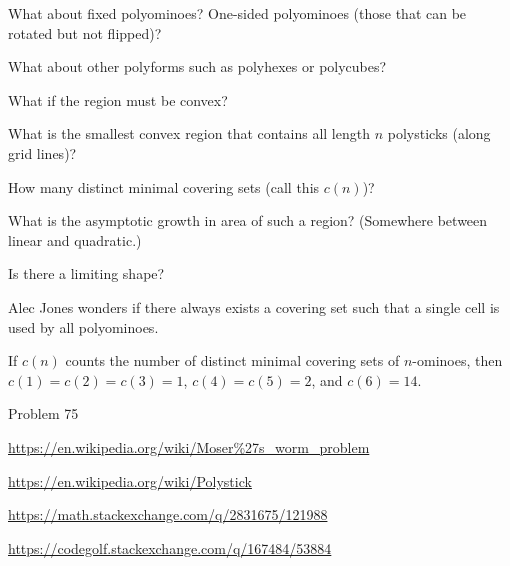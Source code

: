 \documentclass{article}
\begin{document}
\begin{related}
  \item What about fixed polyominoes? One-sided polyominoes (those that can be rotated but not flipped)?
  \item What about other polyforms such as polyhexes or polycubes?
  \item What if the region must be convex?
  \item What is the smallest convex region that contains all length $n$ polysticks (along grid lines)?
  \item How many distinct minimal covering sets (call this $c(n)$)?
  \item What is the asymptotic growth in area of such a region? (Somewhere between linear and quadratic.)
  \item Is there a limiting shape?
  \item Alec Jones wonders if there always exists a covering set such that a single
    cell is used by all polyominoes.
\end{related}

\begin{note}
  If $c(n)$ counts the number of distinct minimal covering sets of $n$-ominoes,
  then $c(1) = c(2) = c(3) = 1$, $c(4) = c(5) = 2$, and $c(6) = 14$.
\end{note}

\begin{references}
  \item Problem 75
  \item \url{https://en.wikipedia.org/wiki/Moser%27s_worm_problem}
  \item \url{https://en.wikipedia.org/wiki/Polystick}
  \item \url{https://math.stackexchange.com/q/2831675/121988}
  \item \url{https://codegolf.stackexchange.com/q/167484/53884}
\end{references}
\end{document}
